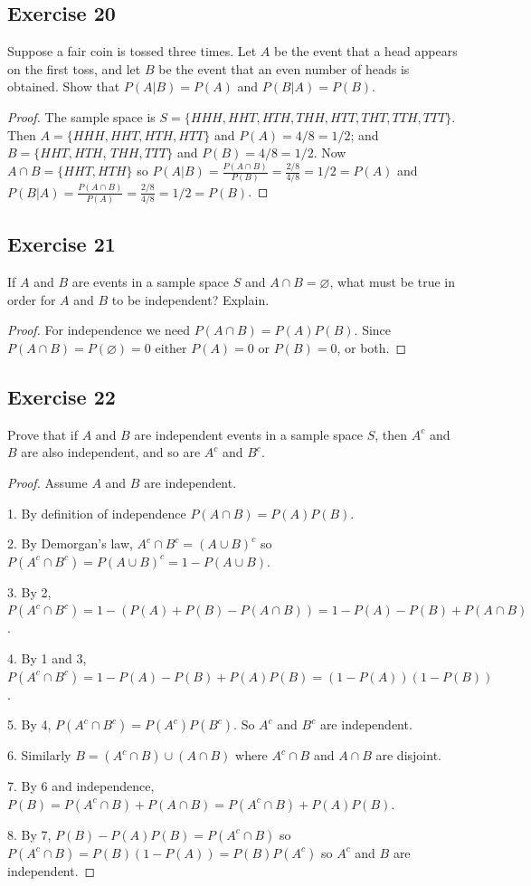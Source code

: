 \documentclass[14pt]{extarticle}
\newcommand{\es}{\varnothing}
\begin{document}
\subsection{Exercise 20}
Suppose a fair coin is tossed three times. Let \(A\) be the event that a head appears on the first toss, and let \(B\) be
the event that an even number of heads is obtained. Show that \(P(A|B) = P(A)\) and \(P(B|A) = P(B)\).

\begin{proof}
     The sample space is \(S = \{HHH, HHT, HTH, THH, HTT, THT, TTH, TTT\}\). Then \(A = \{HHH, HHT, HTH, HTT\}\) and \(P(A) = 4/8
     = 1/2\); and \(B = \{HHT, HTH\), \(THH, TTT\}\) and \(P(B) = 4/8 = 1/2\). Now \(A \cap B = \{HHT, HTH\}\) so \(P(A|B) =
     \frac{P(A \cap B)}{P(B)} = \frac{2/8}{4/8} = 1/2 = P(A)\) and \(P(B|A) = \frac{P(A \cap B)}{P(A)} = \frac{2/8}{4/8} = 1/2 =
     P(B)\).
\end{proof}

\subsection{Exercise 21}
If \(A\) and \(B\) are events in a sample space \(S\) and \(A \cap B = \es\), what must be true in order for \(A\) and \(B\)
to be independent? Explain.

\begin{proof}
     For independence we need \(P(A \cap B) = P(A)P(B)\). Since \(P(A \cap B) = P(\es) = 0\) either \(P(A) = 0\) or \(P(B) =
     0\), or both.
\end{proof}

\subsection{Exercise 22}
Prove that if \(A\) and \(B\) are independent events in a sample space \(S\), then \(A^c\) and \(B\) are also
independent, and so are \(A^c\) and \(B^c\).

\begin{proof}
     Assume \(A\) and \(B\) are independent.

     1. By definition of independence \(P(A \cap B) = P(A)P(B)\).

     2. By Demorgan's law, \(A^c \cap B^c = (A \cup B)^c\) so \(P(A^c \cap B^c) = P(A \cup B)^c = 1 - P(A \cup B)\).

     3. By 2, \(P(A^c \cap B^c) = 1 - (P(A) + P(B) - P(A \cap B)) = 1 - P(A) - P(B) + P(A \cap B)\).

     4. By 1 and 3, \(P(A^c \cap B^c) = 1 - P(A) - P(B) + P(A)P(B) = (1-P(A))(1-P(B))\).

     5. By 4, \(P(A^c \cap B^c) = P(A^c)P(B^c)\). So \(A^c\) and \(B^c\) are independent.

     6. Similarly \(B = (A^c \cap B) \cup (A \cap B)\) where \(A^c \cap B\) and \(A \cap B\) are disjoint.

     7. By 6 and independence, \(P(B) = P(A^c \cap B) + P(A \cap B) = P(A^c \cap B) + P(A)P(B)\).

     8. By 7, \(P(B) - P(A)P(B) = P(A^c \cap B)\) so \(P(A^c \cap B) = P(B)(1-P(A)) = P(B)P(A^c)\) so \(A^c\) and \(B\) are
     independent.
\end{proof}
\end{document}
